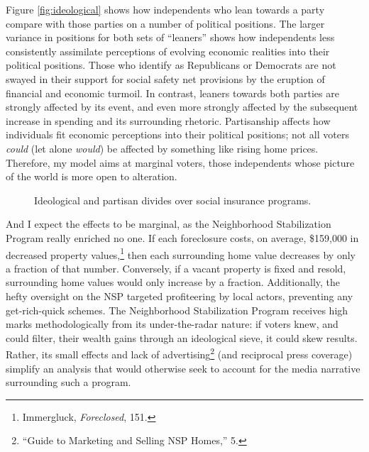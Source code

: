 \documentclass[
]{article}
\begin{document}
Figure \ref{fig:ideological} shows how independents who lean towards a party compare with those parties on a number of political positions.
The larger variance in positions for both sets of ``leaners'' shows how independents less consistently assimilate perceptions of evolving economic realities into their political positions.
Those who identify as Republicans or Democrats are not swayed in their support for social safety net provisions by the eruption of financial and economic turmoil.
In contrast, leaners towards both parties are strongly affected by its event, and even more strongly affected by the subsequent increase in spending and its surrounding rhetoric.
Partisanship affects how individuals fit economic perceptions into their political positions; not all voters \emph{could} (let alone \emph{would}) be affected by something like rising home prices.
Therefore, my model aims at marginal voters, those independents whose picture of the world is more open to alteration.

\begin{figure}

{\centering {}

}

\caption{Ideological and partisan divides over social insurance programs.}\label{fig:ideological-social}
\end{figure}

And I expect the effects to be marginal, as the Neighborhood Stabilization Program really enriched no one.
If each foreclosure costs, on average, \$159,000 in decreased property values,\footnote{Immergluck, \emph{Foreclosed}, 151.} then each surrounding home value decreases by only a fraction of that number.
Conversely, if a vacant property is fixed and resold, surrounding home values would only increase by a fraction.
Additionally, the hefty oversight on the NSP targeted profiteering by local actors, preventing any get-rich-quick schemes.
The Neighborhood Stabilization Program receives high marks methodologically from its under-the-radar nature: if voters knew, and could filter, their wealth gains through an ideological sieve, it could skew results.
Rather, its small effects and lack of advertising\footnote{``Guide to Marketing and Selling NSP Homes,'' 5.} (and reciprocal press coverage) simplify an analysis that would otherwise seek to account for the media narrative surrounding such a program.
\end{document}
